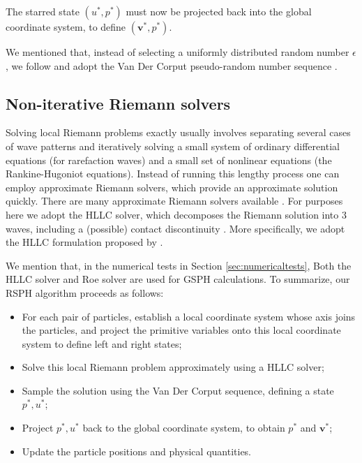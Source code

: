 \documentclass[preprint,12pt,authoryear]{elsarticle}
\begin{document}
The starred state $(u^{\ast},  p^{\ast})$ must now be projected back into the global coordinate system, to define  $(\textbf{v}^{\ast},  p^{\ast})$.

We mentioned that, instead of selecting a uniformly distributed random number $\epsilon$, we follow \citet{colella1982glimm} and adopt the Van Der Corput pseudo-random number sequence \citep{hammersley2013monte}.

\subsection{Non-iterative Riemann solvers} \label{sec:RP-solver}
Solving local Riemann problems exactly usually involves separating several cases of wave patterns and iteratively solving a small system of ordinary differential equations (for rarefaction waves) and a small set of nonlinear equations (the Rankine-Hugoniot equations). Instead of running this lengthy process one can employ approximate Riemann solvers, which provide an approximate solution quickly. There are many approximate Riemann solvers available \citep{rider1994review, luo2004computation, puri2014approximate}. For purposes here we adopt the HLLC solver, which decomposes the Riemann solution into 3 waves, including a (possible) contact discontinuity \cite{toro1994restoration}. More specifically, we adopt the HLLC formulation proposed by \citet{luo2004computation}.
 
We mention that, in the numerical tests in Section \ref{sec:numericaltests}, Both the HLLC solver and Roe solver are used for GSPH calculations.
To summarize, our RSPH algorithm proceeds as follows:
\begin{itemize}
\item For each pair of particles, establish a local coordinate system whose axis joins the particles,
and project the primitive variables onto this local coordinate system to define left and right states;
\item Solve this local Riemann problem approximately using a HLLC solver;
\item Sample the solution using the Van Der Corput sequence, defining a state  $p^{\ast}, u^{\ast}$;
\item Project $p^{\ast}, u^{\ast}$  back to the global coordinate system, to obtain $p^{\ast}$ and $\textbf{v}^{\ast}$;
\item Update the particle positions and physical quantities.
\end{itemize}
\end{document}
